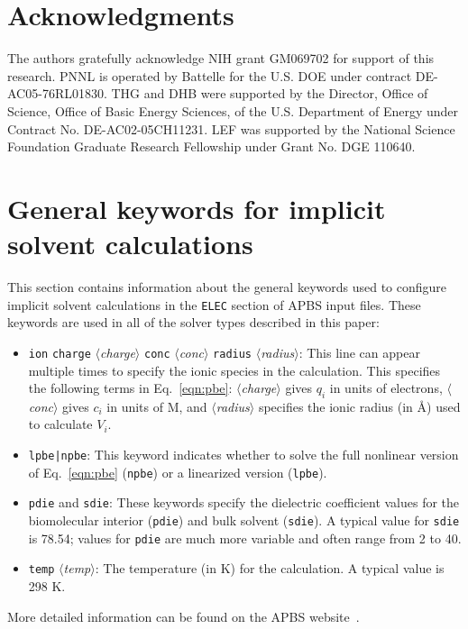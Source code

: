 \documentclass[12pt,titlepage]{article}
\newcommand{\keyword}[1]{\texttt{#1}}
\newcommand{\param}[1]{$\langle$\textit{#1}$\rangle$}
\begin{document}
\section*{Acknowledgments}
The authors gratefully acknowledge NIH grant GM069702 for support of this research.
PNNL is operated by Battelle for the U.S. DOE under contract DE-AC05-76RL01830.  
THG and DHB were supported by the Director, Office of Science, Office of Basic Energy Sciences, of the U.S. Department of Energy under Contract No. DE-AC02-05CH11231.
LEF was supported by the National Science Foundation Graduate Research Fellowship under Grant No. DGE 110640.

\appendix

\section{General keywords for implicit solvent calculations} \label{app:general}
This section contains information about the general keywords used to configure implicit solvent calculations in the \keyword{ELEC} section of APBS input files.
These keywords are used in all of the solver types described in this paper:
\begin{itemize}
	\item \keyword{ion} \keyword{charge} \param{charge} \keyword{conc} \param{conc} \keyword{radius} \param{radius}:  This line can appear multiple times to specify the ionic species in the calculation.
	This specifies the following terms in Eq.~\ref{eqn:pbe}: \param{charge} gives $q_i$ in units of electrons, \param{conc} gives $c_i$ in units of M, and \param{radius} specifies the ionic radius (in \AA) used to calculate $V_i$.
	\item \keyword{lpbe|npbe}: This keyword indicates whether to solve the full nonlinear version of Eq.~\ref{eqn:pbe} (\keyword{npbe}) or a linearized version (\keyword{lpbe}).
	\item \keyword{pdie} and \keyword{sdie}:  These keywords specify the di\-elec\-tric coefficient values for the bio\-mol\-ec\-ular interior (\keyword{pdie}) and bulk solvent (\keyword{sdie}).
	A typical value for \keyword{sdie} is 78.54; values for \keyword{pdie} are much more variable and often range from 2 to 40.
	\item \keyword{temp} \param{temp}:  The temperature (in K) for the calculation.  A typical value is 298 K.
\end{itemize}
More detailed information can be found on the APBS website~\cite{APBSweb}.
\end{document}
